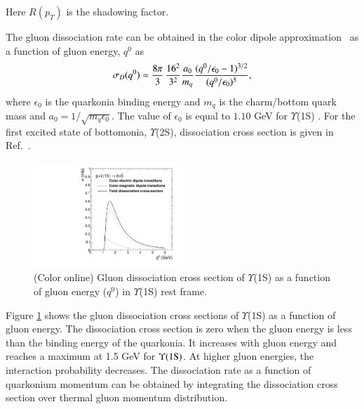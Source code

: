 {  Here $R(p_T)$ is the shadowing factor.

  The gluon dissociation rate can be obtained in the color dipole
approximation~\cite{Bhanot:1979vb} as a function of gluon energy, $q^0$ as
 \begin{equation}
    \sigma_{D}(q^{0}) = {8\pi \over 3} \, {16^2 \over 3^2} {a_0 \over m_q}  \frac{(q^0/\epsilon_0 - 1)^{3/2}} {(q^0/\epsilon_0)^5},
 \end{equation}
  where $\epsilon_0$ is the quarkonia binding energy and $m_q$ is the charm/bottom quark mass 
  and $a_0=1/\sqrt{m_q\epsilon_0}$.
  The value of $\epsilon_0$ is equal to $1.10$ GeV for $\Upsilon$(1S) \cite{Karsch:1987pv}. 
For the first excited state of bottomonia, $\Upsilon$(2S), dissociation
 cross section is given in Ref.~\cite{Arleo:2001mp}.

  \begin{figure}
    \begin{center}
    \includegraphics[width=0.50\textwidth]{Figures/Fig19_Y1S_SigmaDq0.pdf}
    \caption{(Color online) Gluon dissociation cross section of $\Upsilon$(1S) as a
      function of gluon energy ($q^{0}$) in $\Upsilon$(1S) rest frame.}
    \label{fig:SigmaDQ0}
    \end{center}
  \end{figure}

  
  Figure \ref{fig:SigmaDQ0} shows the gluon dissociation cross sections of
$\Upsilon$(1S) as a function of gluon energy. The dissociation cross section
is zero when the gluon energy is less than the binding energy of the quarkonia.
It increases with gluon energy and reaches a maximum at 1.5 GeV for 
$\Upsilon(1{\rm S})$. At higher gluon energies, the interaction
probability decreases. The dissociation rate as a function of quarkonium
momentum can be obtained by integrating the dissociation cross section over thermal gluon momentum 
distribution.


}
